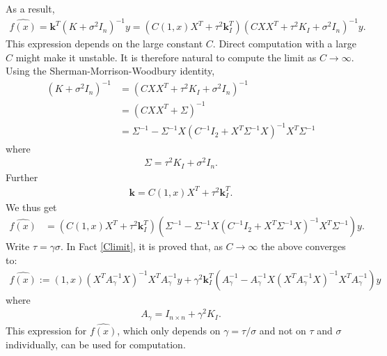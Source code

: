 \documentclass{scrartcl}
\begin{document}
As a result, 
\begin{align*}
  \widehat{f(x)} =
  \mathbf{k}^T \left(K + \sigma^2 I_n \right)^{-1} y = \left(C (1, x)
  X^T + \tau^2 \mathbf{k}_I^T \right) \left(C X X^T + \tau^2 K_I +
  \sigma^2 I_n \right)^{-1} y. 
\end{align*}
This expression depends on the large constant $C$. Direct computation
with a large $C$ might make it unstable. It is therefore natural to
compute the limit as $C \rightarrow \infty$. Using the
Sherman-Morrison-Woodbury identity, 
\begin{align}
(K + \sigma^2 I_n)^{-1} &= (C X X^T + \tau^2 K_I + \sigma^2 I_n)^{-1}
                          \nonumber \\ &= \left(C X X^T + \Sigma
                                         \right)^{-1} \nonumber \\ &=
                                                           \Sigma^{-1}
                                                           -
                                                           \Sigma^{-1}
                                                           X
                                                           \left(C^{-1} 
                            I_2 + X^T \Sigma^{-1} X  \right)^{-1} X^T
                                                                                                                     \Sigma^{-1} \label{smw}
\end{align}
where
\begin{align}\label{Sigdef}
  \Sigma = \tau^2 K_I + \sigma^2 I_n. 
\end{align}
Further
\begin{align*}
  \mathbf{k} = C (1, x) X^T + \tau^2 \mathbf{k}_I^T. 
\end{align*}
We thus get
\begin{align*}
   \widehat{f(x)} &= \left(C (1, x) X^T + \tau^2 \mathbf{k}_I^T \right) \left(\Sigma^{-1} - \Sigma^{-1} X \left(C^{-1}
                            I_2 + X^T \Sigma^{-1} X  \right)^{-1} X^T
                \Sigma^{-1} \right) y. 
\end{align*}
Write $\tau = \gamma \sigma$. In Fact \ref{Climit}, it is proved that,
as $C \rightarrow \infty$ the above converges to:
\begin{align*}
   \widehat{f(x)} := (1, x) \left(X^T A_{\gamma}^{-1} X \right)^{-1} X^T
  A_{\gamma}^{-1} y + \gamma^2 \mathbf{k}_I^T \left(A_{\gamma}^{-1} -
  A_{\gamma}^{-1} X (X^T A_{\gamma}^{-1} X)^{-1} X^T A_{\gamma}^{-1}
  \right) y 
\end{align*}
where
\begin{align*}
    A_{\gamma} = I_{n \times n} + \gamma^2 K_I. 
\end{align*}
This expression for $\widehat{f(x)}$, which only depends on $\gamma = \tau/\sigma$
and not on $\tau$ and $\sigma$ individually, can be used for computation. 
\end{document}
